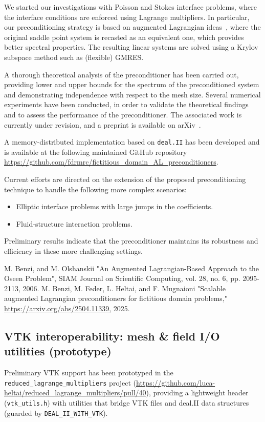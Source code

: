 \documentclass[a4paper,12pt]{article}
\begin{document}
We started our investigations with Poisson and Stokes interface problems, where the interface conditions are enforced
using Lagrange multipliers. In particular, our preconditioning strategy is based on augmented Lagrangian ideas~\cite{BenziAL}, where the original saddle point system is recasted
as an equivalent one, which provides better spectral properties. The resulting linear systems are solved using a Krylov subspace method such as (flexible) GMRES.

A thorough theoretical analysis of the preconditioner has been carried out, providing lower and upper bounds for the spectrum of
the preconditioned system and demonstrating independence with respect to the mesh size. Several numerical experiments have been conducted,
in order to validate the theoretical findings and to assess the performance of the preconditioner. The associated work is currently under revision, and a preprint is available on
arXiv~\cite{ALprec}.

A memory-distributed implementation based on \texttt{deal.II} has been developed and is available at the following maintained GitHub
repository \url{https://github.com/fdrmrc/fictitious_domain_AL_preconditioners}.

Current efforts are directed on the extension of the proposed preconditioning technique to handle
the following more complex scenarios:
\begin{itemize}
    \item Elliptic interface problems with large jumps in the coefficients.
    \item Fluid-structure interaction problems.
\end{itemize}
Preliminary results indicate that the preconditioner maintains its robustness and efficiency in these more
challenging settings.

\begin{thebibliography}{10}
     M. Benzi, and M. Olshanskii "An Augmented Lagrangian-Based Approach to the Oseen Problem", SIAM Journal on Scientific
Computing, vol. 28, no. 6, pp. 2095-2113, 2006.
     M. Benzi, M. Feder, L. Heltai, and F. Mugnaioni "Scalable augmented Lagrangian preconditioners for fictitious domain problems," \url{https://arxiv.org/abs/2504.11339}, 2025.
\end{thebibliography}


\subsection{VTK interoperability: mesh \& field I/O utilities (prototype)}
Preliminary VTK support has been prototyped in the \texttt{reduced\_lagrange\_multipliers}
project (\url{https://github.com/luca-heltai/reduced_lagrange_multipliers/pull/40}),
providing a lightweight header (\texttt{vtk\_utils.h}) with utilities that bridge
VTK files and deal.II data structures (guarded by \texttt{DEAL\_II\_WITH\_VTK}).
\end{document}
